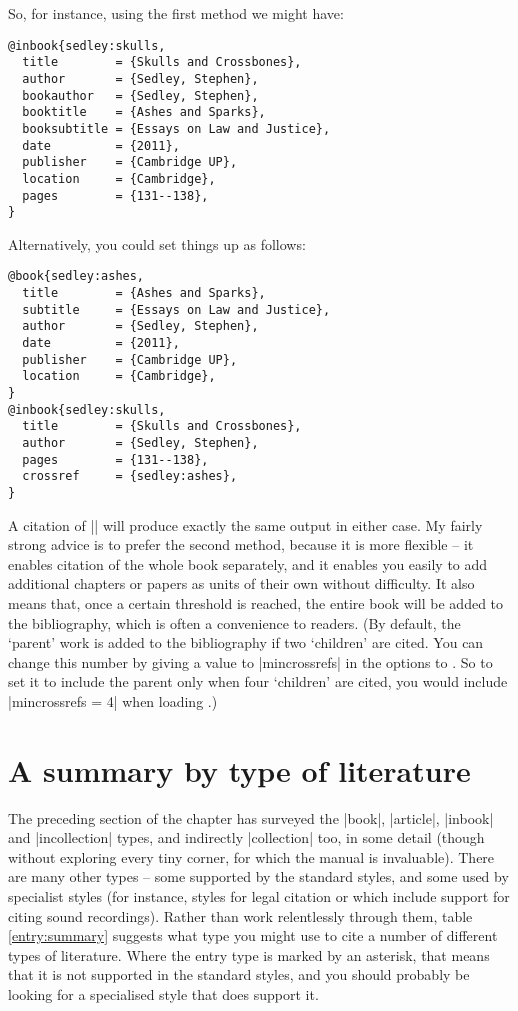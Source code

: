 So, for instance, using the first method we might have:
\begin{Verbatim}
@inbook{sedley:skulls,
  title        = {Skulls and Crossbones},
  author       = {Sedley, Stephen},
  bookauthor   = {Sedley, Stephen},
  booktitle    = {Ashes and Sparks},
  booksubtitle = {Essays on Law and Justice},
  date         = {2011},
  publisher    = {Cambridge UP},
  location     = {Cambridge},
  pages        = {131--138},
}
\end{Verbatim}

Alternatively, you could set things up as follows:
\begin{Verbatim}
@book{sedley:ashes,
  title        = {Ashes and Sparks},
  subtitle     = {Essays on Law and Justice},
  author       = {Sedley, Stephen},
  date         = {2011},
  publisher    = {Cambridge UP},
  location     = {Cambridge},
}
@inbook{sedley:skulls,
  title        = {Skulls and Crossbones},
  author       = {Sedley, Stephen},
  pages        = {131--138},
  crossref     = {sedley:ashes},
}
\end{Verbatim}

A citation of |\cite{sedley:skulls}| will produce exactly the same
output in either case. My fairly strong advice is to prefer the second
method, because it is more flexible -- it enables citation of the
whole book separately, and it enables you easily to add additional
chapters or papers as units of their own without difficulty. It also
means that, once a certain threshold is reached, the entire book will
be added to the bibliography, which is often a convenience to
readers. (By default, the `parent' work is added to the bibliography
if two `children' are cited. You can change this number by giving a
value to |mincrossrefs| in the options to \biblatex. So to set it to
include the parent only when four `children' are cited, you would
include |mincrossrefs = 4| when loading \biblatex.)

\section{A summary by type of literature}

The preceding section of the chapter has surveyed the |book|,
|article|, |inbook| and |incollection| types, and indirectly
|collection| too, in some detail (though without exploring every tiny
corner, for which the manual is invaluable). There are many other
types -- some supported by the standard styles, and some used by
specialist styles (for instance, styles for legal citation or which
include support for citing sound recordings). Rather than work
relentlessly through them, table \ref{entry:summary} suggests what
type you might use to cite a number of different types of
literature. Where the entry type is marked by an asterisk, that means
that it is not supported in the standard styles, and you should
probably be looking for a specialised style that does support it.

